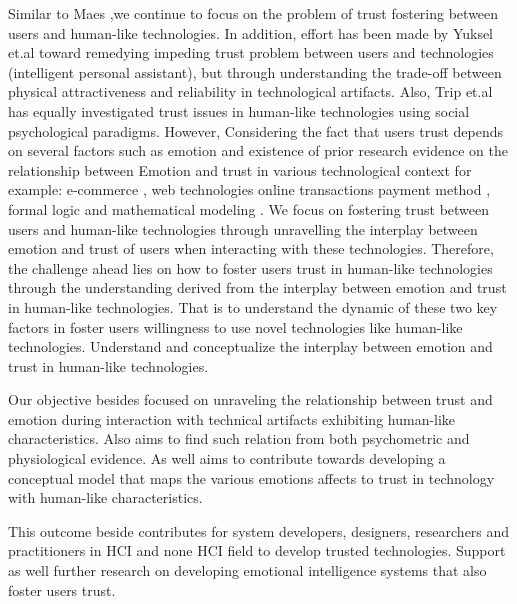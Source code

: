Similar to Maes \cite{maes1995agents:fourtytwo},we continue to focus on the problem of trust fostering between users and human-like technologies.  In addition, effort has been made by Yuksel et.al \cite{yuksel2017brains:fourtythree}toward remedying impeding trust problem between users and technologies (intelligent personal assistant), but through understanding the trade-off between physical attractiveness and reliability in technological artifacts. Also, Trip et.al \cite{tripp2011degrees:four} has equally investigated trust issues in human-like technologies using social psychological paradigms.
However, Considering the fact that users trust depends on several factors such as emotion \cite{jones1998experience:fourtyfour} and existence of prior research evidence on the relationship between Emotion and trust in various technological context for example: e-commerce \cite{pelet2013chromatic:twentyseven}, web technologies \cite{kang2012effect:twentyeight} online transactions payment method \cite{tislar2014emotions:twentynine}, formal logic and mathematical modeling \cite{bonnefon2009relation:thirty}.  We focus on fostering trust between users and human-like technologies through unravelling the interplay between emotion and trust of users when interacting with these technologies.
Therefore, the challenge ahead lies on how to foster users trust in human-like technologies through the understanding derived from the interplay between emotion and trust in human-like technologies.  That is to understand the dynamic of these two key factors in foster users willingness to use novel technologies like human-like technologies. Understand and conceptualize the interplay between emotion and trust in human-like technologies. 

Our objective besides focused on unraveling the relationship between trust and emotion during interaction with technical artifacts exhibiting human-like characteristics. Also aims to find such relation from both psychometric and physiological evidence. As well aims to contribute towards developing a conceptual model that maps the various emotions affects to trust in technology with human-like characteristics. 

This outcome beside contributes for system developers, designers, researchers and practitioners in HCI and none HCI field to develop trusted technologies. Support as well further research on developing  emotional intelligence systems that  also foster users trust.

